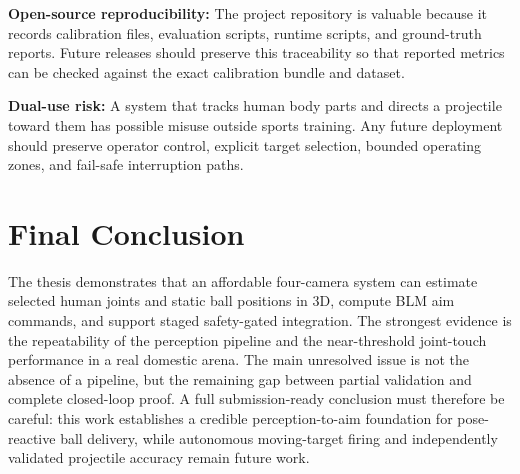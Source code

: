 \textbf{Open-source reproducibility:} The project repository is valuable because it records calibration files, evaluation scripts, runtime scripts, and ground-truth reports. Future releases should preserve this traceability so that reported metrics can be checked against the exact calibration bundle and dataset.

\textbf{Dual-use risk:} A system that tracks human body parts and directs a projectile toward them has possible misuse outside sports training. Any future deployment should preserve operator control, explicit target selection, bounded operating zones, and fail-safe interruption paths.

\section{Final Conclusion}

The thesis demonstrates that an affordable four-camera system can estimate selected human joints and static ball positions in 3D, compute BLM aim commands, and support staged safety-gated integration. The strongest evidence is the repeatability of the perception pipeline and the near-threshold joint-touch performance in a real domestic arena. The main unresolved issue is not the absence of a pipeline, but the remaining gap between partial validation and complete closed-loop proof. A full submission-ready conclusion must therefore be careful: this work establishes a credible perception-to-aim foundation for pose-reactive ball delivery, while autonomous moving-target firing and independently validated projectile accuracy remain future work.
